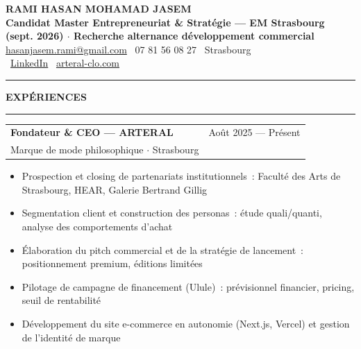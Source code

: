 \documentclass[10.5pt,a4paper]{article}
\makeatletter
\newcommand{\leftsection}[1]{
    \vspace{7pt}
    {\small\bfseries\color{darktext}\MakeUppercase{#1}}\\[-5pt]
    {\color{rulecolor}\rule{\linewidth}{0.7pt}}
    \vspace{3pt}
}
\newcommand{\cventry}[4]{
    \noindent
    \begin{tabularx}{\linewidth}{@{}X r@{}}
        \textbf{\small #1} & {\footnotesize\color{graytext}#2} \\
        {\footnotesize\color{graytext}#3} & \\
    \end{tabularx}
    \vspace{1pt}
    #4
    \vspace{5pt}
}
\makeatother
\begin{document}
\colorbox{sidecolor}{%
\begin{minipage}[t][297mm][t]{0.62\textwidth}
\hspace{0.5cm}
\begin{minipage}[t]{0.88\linewidth}
\vspace{1.0cm}

{\large\bfseries RAMI HASAN MOHAMAD JASEM}\\[3pt]
{\small\bfseries\color{graytext}Candidat Master Entrepreneuriat \& Strat\'egie — EM Strasbourg (sept. 2026) $\cdot$ Recherche alternance d\'eveloppement commercial}\\[3pt]
{\small\color{graytext}
    \href{mailto:hasanjasem.rami@gmail.com}{hasanjasem.rami@gmail.com}
    \quad\textbar\quad
    \faPhone\ 07 81 56 08 27
    \quad\textbar\quad
    \faMapMarker*\ Strasbourg\\[2pt]
    \faLinkedin\ \href{https://www.linkedin.com/in/rami-hasan-mohamad-jasem-a6662a272}{LinkedIn}
    \quad\textbar\quad
    \faGlobe\ \href{https://arteral-clo.com}{arteral-clo.com}
}

\vspace{5pt}
{\color{rulecolor}\rule{\linewidth}{0.6pt}}

\leftsection{Exp\'eriences}

\cventry{Fondateur \& CEO — ARTERAL}{Ao\^ut 2025 — Pr\'esent}{Marque de mode philosophique $\cdot$ Strasbourg}{
\begin{itemize}
    \item Prospection et closing de partenariats institutionnels~: Facult\'e des Arts de Strasbourg, HEAR, Galerie Bertrand Gillig
    \item Segmentation client et construction des personas~: \'etude quali/quanti, analyse des comportements d'achat
    \item \'Elaboration du pitch commercial et de la strat\'egie de lancement~: positionnement premium, \'editions limit\'ees
    \item Pilotage de campagne de financement (Ulule)~: pr\'evisionnel financier, pricing, seuil de rentabilit\'e
    \item D\'eveloppement du site e-commerce en autonomie (Next.js, Vercel) et gestion de l'identit\'e de marque
\end{itemize}
}


\end{minipage}
\end{minipage}}
\end{document}
